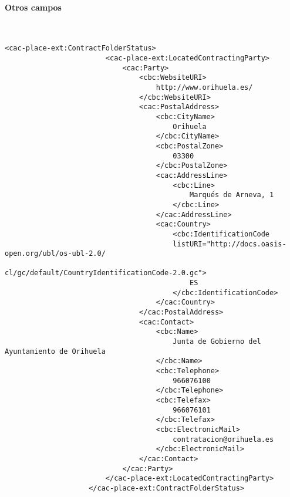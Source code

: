             \paragraph{Otros campos} \mbox{}\\
                \begin{lstlisting}[language=lXML]
                    <cac-place-ext:ContractFolderStatus>
                        <cac-place-ext:LocatedContractingParty>
                            <cac:Party>
                                <cbc:WebsiteURI>
                                    http://www.orihuela.es/
                                </cbc:WebsiteURI>
                                <cac:PostalAddress>
                                    <cbc:CityName>
                                        Orihuela
                                    </cbc:CityName>
                                    <cbc:PostalZone>
                                        03300
                                    </cbc:PostalZone>
                                    <cac:AddressLine>
                                        <cbc:Line>
                                            Marqués de Arneva, 1
                                        </cbc:Line>
                                    </cac:AddressLine>
                                    <cac:Country>
                                        <cbc:IdentificationCode
                                        listURI="http://docs.oasis-open.org/ubl/os-ubl-2.0/
                                        cl/gc/default/CountryIdentificationCode-2.0.gc">
                                            ES
                                        </cbc:IdentificationCode>
                                    </cac:Country>
                                </cac:PostalAddress>
                                <cac:Contact>
                                    <cbc:Name>
                                        Junta de Gobierno del Ayuntamiento de Orihuela
                                    </cbc:Name>
                                    <cbc:Telephone>
                                        966076100
                                    </cbc:Telephone>
                                    <cbc:Telefax>
                                        966076101
                                    </cbc:Telefax>
                                    <cbc:ElectronicMail>
                                        contratacion@orihuela.es
                                    </cbc:ElectronicMail>
                                </cac:Contact>
                            </cac:Party>
                        </cac-place-ext:LocatedContractingParty>
                    </cac-place-ext:ContractFolderStatus>
                \end{lstlisting}
                
